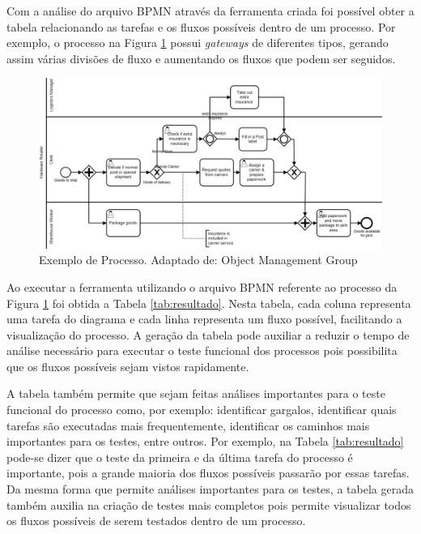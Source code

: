 \documentclass[12pt]{article}
\begin{document}
Com a análise do arquivo BPMN através da ferramenta criada foi possível obter a tabela relacionando as tarefas e os fluxos possíveis dentro de um processo. Por exemplo, o processo na Figura \ref{fig:diagrama_exemplo} possui \emph{gateways} de diferentes tipos, gerando assim várias divisões de fluxo e aumentando os fluxos que podem ser seguidos. 

\begin{figure}[ht]
\includegraphics[width=.9\textwidth]{figuras/diagrama_exemplo.png}
\caption{Exemplo de Processo. Adaptado de: Object Management Group}
\label{fig:diagrama_exemplo}
\end{figure}

Ao executar a ferramenta utilizando o arquivo BPMN referente ao processo da Figura \ref{fig:diagrama_exemplo} foi obtida a Tabela \ref{tab:resultado}. Nesta tabela, cada coluna representa uma tarefa do diagrama e cada linha representa um fluxo possível, facilitando a visualização do processo. A geração da tabela pode auxiliar a reduzir o tempo de análise necessário para executar o teste funcional dos processos pois possibilita que os fluxos possíveis sejam vistos rapidamente. 

A tabela também permite que sejam feitas análises importantes para o teste funcional do processo como, por exemplo: identificar gargalos, identificar quais tarefas são executadas mais frequentemente, identificar os caminhos mais importantes para os testes, entre outros. Por exemplo, na Tabela \ref{tab:resultado} pode-se dizer que o teste da primeira e da última tarefa do processo é importante, pois a grande maioria dos fluxos possíveis passarão por essas tarefas. Da mesma forma que permite análises importantes para os testes, a tabela gerada também auxilia na criação de testes mais completos pois permite visualizar todos os fluxos possíveis de serem testados dentro de um processo.
\end{document}
